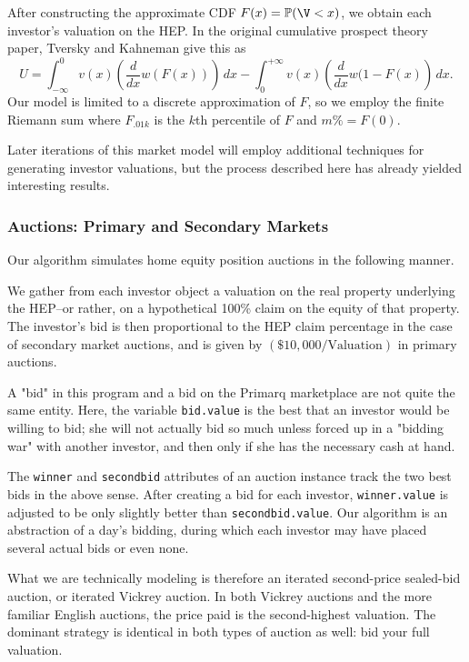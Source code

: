\documentclass[twoside]{article}
\renewcommand{\P}{\mathbb{P}}
\begin{document}
After constructing the approximate CDF $F(x)=\P(\V<x)$, we obtain each investor's valuation on the HEP. In the original cumulative prospect theory paper, Tversky and Kahneman give this as
$$
U=\int_{-\infty}^0 v(x)\left(\frac{d}{dx}w(F(x))\right)\,dx-\int_0^{+\infty} v(x)\left(\frac{d}{dx}w(1-F(x)\right)\,dx.
$$
Our model is limited to a discrete approximation of $F$, so we employ the finite Riemann sum 
where $F_{.01k}$ is the $k$th percentile of $F$ and $m\%=F(0)$.

Later iterations of this market model will employ additional techniques for generating investor valuations, but the process described here has already yielded interesting results.


\subsubsection{Auctions: Primary and Secondary Markets}
Our algorithm simulates home equity position auctions in the following manner.

We gather from each investor object a valuation on the real property underlying the HEP--or rather, on a hypothetical 100\% claim on the equity of that property. The investor's bid is then proportional to the HEP claim percentage in the case of secondary market auctions, and is given by $(\$10,000/\mathrm{Valuation})$ in primary auctions. 

A "bid" in this program and a bid on the Primarq
 marketplace are not quite the same entity.
 Here, the variable \verb+bid.value+ is the best that an investor
 would be willing to bid; she will not actually bid
 so much unless forced up in a "bidding war" with
 another investor, and then only if she has the necessary cash at hand.

 The \verb+winner+ and \verb+secondbid+ attributes of an
 auction instance track the two best bids in the
 above sense. After creating a bid for each investor, \verb+winner.value+
 is adjusted to be only slightly better than \verb+secondbid.value+.
Our algorithm is an abstraction of a day's bidding, during which each investor may have placed several actual bids or even none.

 What we are technically modeling is therefore an iterated
 second-price sealed-bid auction, or iterated Vickrey auction. In both Vickrey auctions and  the more familiar English auctions, the price paid is the second-highest valuation. The dominant strategy is identical in both types of auction as well: bid your full valuation. 
 
\end{document}
